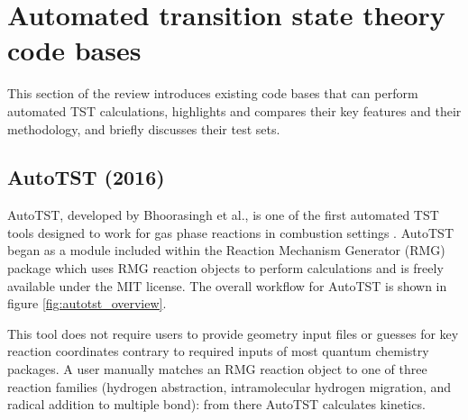 \documentclass[preprint, 11pt]{elsarticle} %
\begin{document}


\section{Automated transition state theory code bases}

This section of the review introduces existing code bases that can perform automated TST calculations, highlights and compares their key features and their methodology, and briefly discusses their test sets.


\subsection{AutoTST (2016)}

AutoTST, developed by Bhoorasingh et al., is one of the first automated TST tools designed to work for gas phase reactions in combustion settings \cite{bhoorasingh:2017}.
AutoTST began as a module included within the Reaction Mechanism Generator (RMG) package which uses RMG reaction objects to perform calculations and is freely available under the MIT license. 
The overall workflow for AutoTST is shown in figure \ref{fig:autotst_overview}.

This tool does not require users to provide geometry input files or guesses for key reaction coordinates contrary to required inputs of most quantum chemistry packages.
A user manually matches an RMG reaction object to one of three reaction families (hydrogen abstraction, intramolecular hydrogen migration, and radical addition to multiple bond): from there AutoTST calculates kinetics. 
\end{document}
